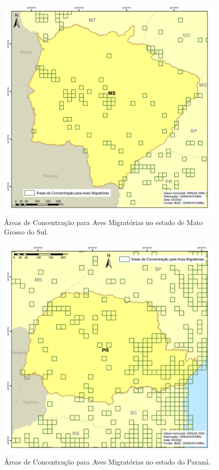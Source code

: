 \documentclass[
  oneside]{scrbook}
\begin{document}
\begin{figure}[H]

{\centering \includegraphics[width=0.75\linewidth]{imagens/cap07/Figura_7.34_MS} 

}

\caption{Áreas de Concentração para Aves Migratórias no estado de Mato Grosso do Sul.}\label{fig:54}
\end{figure}

\begin{figure}[H]

{\centering \includegraphics[width=0.75\linewidth]{imagens/cap07/Figura_7.35_PR} 

}

\caption{Áreas de Concentração para Aves Migratórias no estado do Paraná.}\label{fig:55}
\end{figure}
\end{document}

